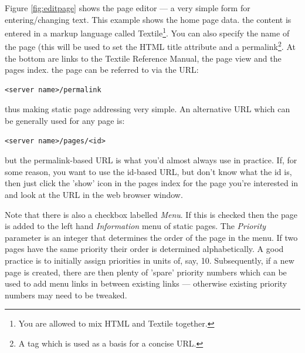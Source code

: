 \documentclass[12pt,twoside]{article}
\begin{document}
Figure \ref{fig:editpage} shows the page editor --- a very simple form
for entering/changing text. This example shows the home page data. 
the content is entered in a markup language called Textile\footnote{You are 
allowed to mix HTML and Textile together.}. You can also specify the name
of the page (this will be used to set the HTML title attribute and a
permalink\footnote{A tag which is used as a basis for a concise URL.}.
At the bottom are links to the Textile Reference Manual, the page view
and the pages index. the page can be referred to via the URL:
\begin{verbatim}
<server name>/permalink
\end{verbatim}
thus making static page addressing very simple.
An alternative URL which can be generally used for any page is:
\begin{verbatim}
<server name>/pages/<id>
\end{verbatim}
but the permalink-based URL is what you'd almost always use in practice.
If, for some reason, you want to use the id-based URL, but don't know
what the id is, then just click the 'show' icon in the pages index for
the page you're interested in and look at the URL in the web browser window.

Note that there is also a checkbox labelled \emph{Menu}. If this is
checked then the page is added to the left hand \emph{Information} menu
of static pages. The \emph{Priority} parameter is an integer that
determines the order of the page in the menu. If two pages have the same
priority their order is determined alphabetically.
A good practice is to initially assign priorities in units of, say, 10.
Subsequently, if a new page is created, there are then plenty of 'spare'
priority numbers which can be used to add menu links in between
existing links --- otherwise existing priority numbers may need to be tweaked.
\end{document}
